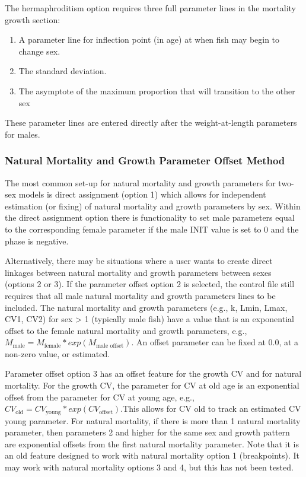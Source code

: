 The hermaphroditism option requires three full parameter lines in the mortality growth section: 
\begin{enumerate}
	\item A parameter line for inflection point (in age) at when fish may begin to change sex.
	\item The standard deviation.
	\item The asymptote of the maximum proportion that will transition to the other sex
\end{enumerate}
These parameter lines are entered directly after the weight-at-length parameters for males.

\pagebreak
\hypertarget{offset}{}
\subsubsection{Natural Mortality and Growth Parameter Offset Method}

The most common set-up for natural mortality and growth parameters for two-sex models is direct assignment (option 1) which allows for independent estimation (or fixing) of natural mortality and growth parameters by sex. Within the direct assignment option there is functionality to set male parameters equal to the corresponding female parameter if the male INIT value is set to 0 and the phase is negative. 

Alternatively, there may be situations where a user wants to create direct linkages between natural mortality and growth parameters between sexes (options 2 or 3). If the parameter offset option 2 is selected, the control file still requires that all male natural mortality and growth parameters lines to be included. The natural mortality and growth parameters (e.g., k, Lmin, Lmax, CV1, CV2) for sex > 1 (typically male fish) have a value that is an exponential offset to the female natural mortality and growth parameters, e.g., $M_{\text{male}} = M_{\text{female}}*exp(M_{\text{male offset}})$. An offset parameter can be fixed at 0.0, at a non-zero value, or estimated.

Parameter offset option 3 has an offset feature for the growth CV and for natural mortality. For the growth CV, the parameter for CV at old age is an exponential offset from the parameter for CV at young age, e.g., $CV_{\text{old}} = CV_{\text{young}}*exp(CV_{\text{offset}})$.This allows for CV old to track an estimated CV young parameter. For natural mortality, if there is more than 1 natural mortality parameter, then parameters 2 and higher for the same sex and growth pattern are exponential offsets from the first natural mortality parameter. Note that it is an old feature designed to work with natural mortality option 1 (breakpoints). It may work with natural mortality options 3 and 4, but this has not been tested.



